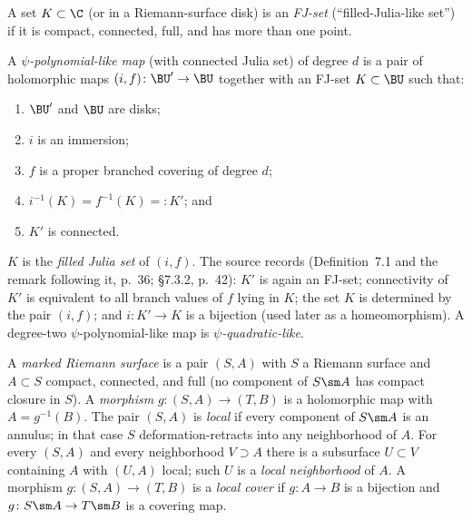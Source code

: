\begin{definition}\label{def:fjset}
A set \(K\subset\C\) (or in a Riemann-surface disk) is an \emph{FJ-set}
(``filled-Julia-like set'') if it is compact, connected, full, and has
more than one point.
\end{definition}

\begin{definition}\label{def:psipl}
A \emph{\(\psi\)-polynomial-like map} (with connected Julia set) of degree
\(d\) is a pair of holomorphic maps \((i,f)\colon\BU'\to\BU\) together
with an FJ-set \(K\subset\BU\) such that:
\begin{enumerate}
\item \(\BU'\) and \(\BU\) are disks;
\item \(i\) is an immersion;
\item \(f\) is a proper branched covering of degree \(d\);
\item \(i^{-1}(K)=f^{-1}(K)=:K'\); and
\item \(K'\) is connected.
\end{enumerate}
\(K\) is the \emph{filled Julia set} of \((i,f)\).  The source records
(Definition~7.1 and the remark following it, p.~36; \S7.3.2, p.~42): \(K'\) is again an FJ-set; connectivity of \(K'\)
is equivalent to all branch values of \(f\) lying in \(K\); the set
\(K\) is determined by the pair \((i,f)\); and
\(i\colon K'\to K\) is a bijection (used later as a homeomorphism).
A degree-two \(\psi\)-polynomial-like map is \emph{\(\psi\)-quadratic-like}.
\end{definition}

\begin{definition}\label{def:local}
A \emph{marked Riemann surface} is a pair \((S,A)\) with \(S\) a Riemann
surface and \(A\subset S\) compact, connected, and full (no component of
\(S\sm A\) has compact closure in \(S\)).  A \emph{morphism}
\(g\colon(S,A)\to(T,B)\) is a holomorphic map with \(A=g^{-1}(B)\).
The pair \((S,A)\) is \emph{local} if every component of \(S\sm A\) is
an annulus; in that case \(S\) deformation-retracts into any
neighborhood of \(A\).  For every \((S,A)\) and every neighborhood
\(V\supset A\) there is a subsurface \(U\subset V\) containing \(A\)
with \((U,A)\) local; such \(U\) is a \emph{local neighborhood} of
\(A\).  A morphism \(g\colon(S,A)\to(T,B)\) is a \emph{local cover} if
\(g\colon A\to B\) is a bijection and \(g\colon S\sm A\to T\sm B\) is a
covering map.
\end{definition}

